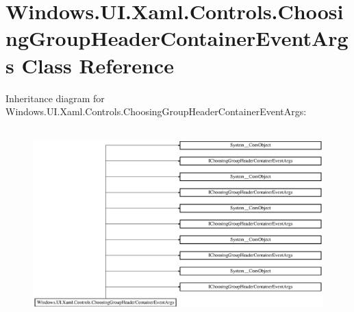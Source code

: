 \hypertarget{class_windows_1_1_u_i_1_1_xaml_1_1_controls_1_1_choosing_group_header_container_event_args}{}\section{Windows.\+U\+I.\+Xaml.\+Controls.\+Choosing\+Group\+Header\+Container\+Event\+Args Class Reference}
\label{class_windows_1_1_u_i_1_1_xaml_1_1_controls_1_1_choosing_group_header_container_event_args}
Inheritance diagram for Windows.\+U\+I.\+Xaml.\+Controls.\+Choosing\+Group\+Header\+Container\+Event\+Args\+:\begin{figure}[H]
\begin{center}
\leavevmode
\includegraphics[height=7.403846cm]{class_windows_1_1_u_i_1_1_xaml_1_1_controls_1_1_choosing_group_header_container_event_args}
\end{center}
\end{figure}
